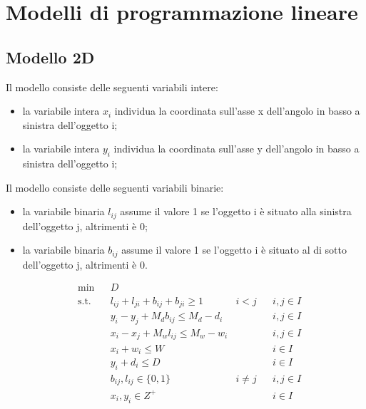 
\chapter{Modelli di programmazione lineare}
\label{chap:four}

\section{Modello 2D}
Il modello consiste delle seguenti variabili intere:
\begin{itemize}
    \item la variabile intera $x_{i}$ individua la coordinata sull'asse x dell'angolo in basso a sinistra dell'oggetto i;
    \item la variabile intera $y_{i}$ individua la coordinata sull'asse y dell'angolo in basso a sinistra dell'oggetto i;
\end{itemize}
Il modello consiste delle seguenti variabili binarie:
\begin{itemize}
    \item la variabile binaria $l_{ij}$ assume il valore 1 se l'oggetto i è situato alla sinistra dell'oggetto j, altrimenti è 0;
    \item la variabile binaria $b_{ij}$ assume il valore 1 se l'oggetto i è situato al di sotto dell'oggetto j, altrimenti è 0.
\end{itemize}

\begin{equation*}
    \begin{aligned}
    & \underset{}{\text{min}}
    & & D \\
    & \text{s.t.} & &  l_{ij} + l_{ji} + b_{ij} + b_{ji} \geq 1 & i < j & & i,j \in I \\
    & & & y_i - y_j + M_d b_{ij} \leq M_d - d_i & & & i,j \in I \\
    & & & x_i - x_j + M_w l_{ij} \leq M_w - w_i & & & i,j \in I \\
    & & & x_i + w_i \leq W & & & i \in I \\
    & & & y_i + d_i \leq D & & & i \in I \\
    & & & b_{ij}, l_{ij} \in \{0,1\} & i \neq j & & i,j \in I \\
    & & & x_{i}, y_{i} \in Z^{+} & & & i \in I \\
    \end{aligned}
\end{equation*}

